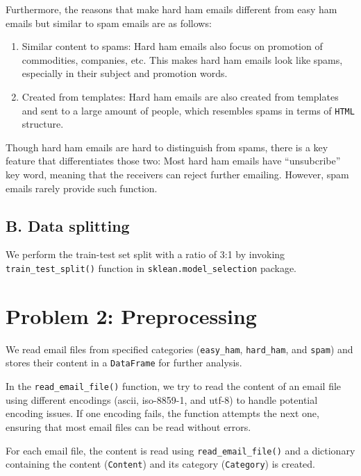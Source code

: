 \documentclass[11pt]{article}
\begin{document}
Furthermore, the reasons that make hard ham emails different from easy
ham emails but similar to spam emails are as follows:

\begin{enumerate}
\def\labelenumi{\arabic{enumi}.}
\item
  Similar content to spams: Hard ham emails also focus on promotion of
  commodities, companies, etc. This makes hard ham emails look like
  spams, especially in their subject and promotion words.
\item
  Created from templates: Hard ham emails are also created from
  templates and sent to a large amount of people, which resembles spams
  in terms of \texttt{HTML} structure.
\end{enumerate}

Though hard ham emails are hard to distinguish from spams, there is a
key feature that differentiates those two: Most hard ham emails have
``unsubcribe'' key word, meaning that the receivers can reject further
emailing. However, spam emails rarely provide such function.

\hypertarget{b.-data-splitting}{%
\subsection{B. Data splitting}\label{b.-data-splitting}}

We perform the train-test set split with a ratio of 3:1 by invoking
\texttt{train\_test\_split()} function in
\texttt{sklean.model\_selection} package.

    \hypertarget{problem-2-preprocessing}{%
\section{Problem 2: Preprocessing}\label{problem-2-preprocessing}}

We read email files from specified categories (\texttt{easy\_ham},
\texttt{hard\_ham}, and \texttt{spam}) and stores their content in a
\texttt{DataFrame} for further analysis.

In the \texttt{read\_email\_file()} function, we try to read the content
of an email file using different encodings (ascii, iso-8859-1, and
utf-8) to handle potential encoding issues. If one encoding fails, the
function attempts the next one, ensuring that most email files can be
read without errors.

For each email file, the content is read using
\texttt{read\_email\_file()} and a dictionary containing the content
(\texttt{Content}) and its category (\texttt{Category}) is created.
\end{document}
